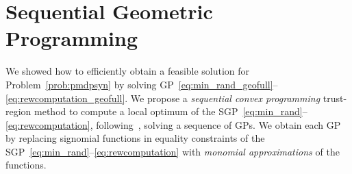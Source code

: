 \section{Sequential Geometric Programming}\label{sec:approximation}

We showed how to efficiently obtain a feasible solution
 for Problem~\ref{prob:pmdpsyn} by solving GP~\eqref{eq:min_rand_geofull}--\eqref{eq:rewcomputation_geofull}. %
%
We propose a \emph{sequential convex programming} trust-region method to compute a local optimum of the SGP~\eqref{eq:min_rand}--\eqref{eq:rewcomputation}, following~\cite[\S{}9.1]{boyd2007tutorial}, solving a sequence of GPs. We obtain each GP by replacing signomial functions in equality constraints of the SGP~\eqref{eq:min_rand}--\eqref{eq:rewcomputation} with \emph{monomial approximations} of the functions. 



